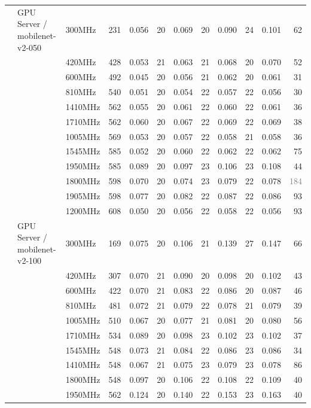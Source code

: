 \documentclass[10pt]{article}
\begin{document}
\begin{center}
\begin{longtable}{@{}lll r *{4}{r r}@{}}
\addlinespace[2pt]
 & GPU Server / mobilenet-v2-050 & 300MHz & 231 & 0.056 & 20 & 0.069 & 20 & 0.090 & 24 & 0.101 & 62 \\
 &  & 420MHz & 428 & 0.053 & 21 & 0.063 & 21 & 0.068 & 20 & 0.070 & 52 \\
 &  & 600MHz & 492 & 0.045 & 20 & 0.056 & 21 & 0.062 & 20 & 0.061 & 31 \\
 &  & 810MHz & 540 & 0.051 & 20 & 0.054 & 22 & 0.057 & 22 & 0.056 & 30 \\
 &  & 1410MHz & 562 & 0.055 & 20 & 0.061 & 22 & 0.060 & 22 & 0.061 & 36 \\
 &  & 1710MHz & 562 & 0.060 & 20 & 0.067 & 22 & 0.069 & 22 & 0.069 & 38 \\
 &  & 1005MHz & 569 & 0.053 & 20 & 0.057 & 22 & 0.058 & 21 & 0.058 & 36 \\
 &  & 1545MHz & 585 & 0.052 & 20 & 0.060 & 22 & 0.062 & 22 & 0.062 & 75 \\
 &  & 1950MHz & 585 & 0.089 & 20 & 0.097 & 23 & 0.106 & 23 & 0.108 & 44 \\
 &  & 1800MHz & 598 & 0.070 & 20 & 0.074 & 23 & 0.079 & 22 & 0.078 & \textcolor{gray}{184} \\
 &  & 1905MHz & 598 & 0.077 & 20 & 0.082 & 22 & 0.087 & 22 & 0.086 & 93 \\
 &  & 1200MHz & 608 & 0.050 & 20 & 0.056 & 22 & 0.058 & 22 & 0.056 & 93 \\
\addlinespace[2pt]
 & GPU Server / mobilenet-v2-100 & 300MHz & 169 & 0.075 & 20 & 0.106 & 21 & 0.139 & 27 & 0.147 & 66 \\
 &  & 420MHz & 307 & 0.070 & 21 & 0.090 & 20 & 0.098 & 20 & 0.102 & 43 \\
 &  & 600MHz & 422 & 0.070 & 21 & 0.083 & 22 & 0.086 & 20 & 0.087 & 46 \\
 &  & 810MHz & 481 & 0.072 & 21 & 0.079 & 22 & 0.078 & 21 & 0.079 & 39 \\
 &  & 1005MHz & 510 & 0.067 & 20 & 0.077 & 21 & 0.081 & 20 & 0.080 & 56 \\
 &  & 1710MHz & 534 & 0.089 & 20 & 0.098 & 23 & 0.102 & 23 & 0.102 & 37 \\
 &  & 1545MHz & 548 & 0.073 & 21 & 0.084 & 22 & 0.086 & 23 & 0.086 & 34 \\
 &  & 1410MHz & 548 & 0.067 & 21 & 0.075 & 23 & 0.079 & 23 & 0.078 & 86 \\
 &  & 1800MHz & 548 & 0.097 & 20 & 0.106 & 22 & 0.108 & 22 & 0.109 & 40 \\
 &  & 1950MHz & 562 & 0.124 & 20 & 0.140 & 22 & 0.153 & 23 & 0.163 & 40 \\

\end{longtable}
\end{center}
\end{document}

